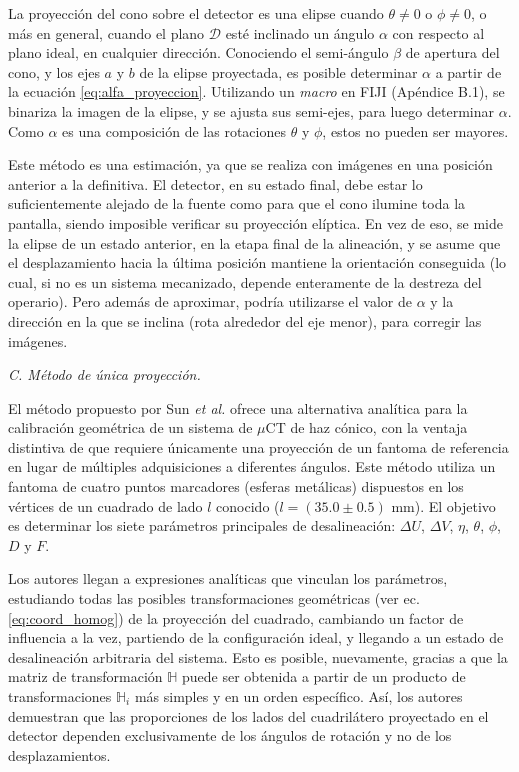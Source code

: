 La proyección del cono sobre el detector es una elipse cuando $\theta \neq 0$ o $\phi \neq 0$,
o más en general, cuando el plano $\mathcal{D}$ esté inclinado un ángulo $\alpha$ con respecto
al plano ideal, en cualquier dirección. Conociendo el semi-ángulo $\beta$ de apertura del cono,
y los ejes $a$ y $b$ de la elipse proyectada, es posible determinar $\alpha$ a partir de la
ecuación \ref{eq:alfa_proyeccion}. Utilizando un \textit{macro} en FIJI (Apéndice B.1), se binariza la imagen de
la elipse, y se ajusta sus semi-ejes, para luego determinar $\alpha$. Como $\alpha$ es una
composición de las rotaciones $\theta$ y $\phi$, estos no pueden ser mayores.

Este método es una estimación, ya que se realiza con imágenes en una posición anterior a
la definitiva. El detector, en su estado final, debe estar lo suficientemente alejado de
la fuente como para que el cono ilumine toda la pantalla, siendo imposible verificar su
proyección elíptica. En vez de eso, se mide la elipse de un estado anterior, en la etapa
final de la alineación, y se asume que el desplazamiento hacia la última posición mantiene
la orientación conseguida (lo cual, si no es un sistema mecanizado, depende enteramente
de la destreza del operario). Pero además de aproximar, podría utilizarse el valor de
$\alpha$ y la dirección en la que se inclina (rota alrededor del eje menor), para corregir
las imágenes.

\medskip
\textit{C. Método de única proyección.}
\smallskip

El método propuesto por Sun \textit{et al.} \cite{Sun2006} ofrece una alternativa analítica para la 
calibración geométrica de un sistema de $\mu$CT de haz cónico, con la ventaja distintiva de que
requiere únicamente una proyección de un fantoma de referencia en lugar de múltiples adquisiciones
a diferentes ángulos. Este método utiliza un fantoma de cuatro puntos marcadores (esferas metálicas)
dispuestos en los vértices de un cuadrado de lado $l$ conocido ($l=(35.0 \pm 0.5)$ mm). El objetivo es determinar los siete
parámetros principales de desalineación: $\Delta U$, $\Delta V$, $\eta$, $\theta$, $\phi$, $D$ y $F$.

Los autores llegan a expresiones analíticas que vinculan los parámetros, estudiando todas las
posibles transformaciones geométricas (ver ec. \ref{eq:coord_homog}) de la proyección del cuadrado,
cambiando un factor de influencia a la vez, partiendo de la configuración ideal, y llegando a un
estado de desalineación arbitraria del sistema. Esto es posible, nuevamente, gracias a que la
matriz de transformación $\mathbb{H}$ puede ser obtenida a partir de un producto de transformaciones
$\mathbb{H}_i$ más simples y en un orden específico. Así, los autores demuestran que las
proporciones de los lados del cuadrilátero proyectado en el detector dependen exclusivamente de los
ángulos de rotación y no de los desplazamientos.

